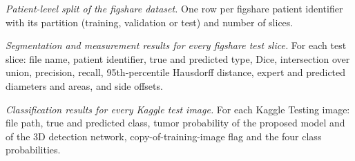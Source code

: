 \documentclass[pdflatex,sn-vancouver-num]{sn-jnl}
\begin{document}
\emph{Patient-level split of the figshare dataset.} One row per figshare patient identifier with its partition (training, validation or test) and number of slices.

\emph{Segmentation and measurement results for every figshare test slice.} For each test slice: file name, patient identifier, true and predicted type, Dice, intersection over union, precision, recall, 95th-percentile Hausdorff distance, expert and predicted diameters and areas, and side offsets.

\emph{Classification results for every Kaggle test image.} For each Kaggle Testing image: file path, true and predicted class, tumor probability of the proposed model and of the 3D detection network, copy-of-training-image flag and the four class probabilities.
\end{document}
